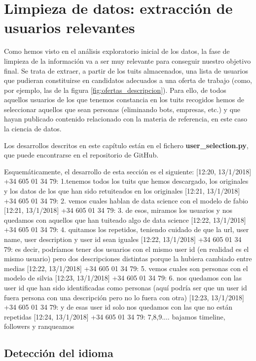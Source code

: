 
\chapter{Limpieza de datos: extracción de usuarios relevantes}
\label{chap:extraccion_de_usuarios}

Como hemos visto en el análisis exploratorio inicial de los datos, la fase 
de limpieza de la información va a ser muy relevante para conseguir
nuestro objetivo final. Se trata de extraer, a partir de los tuits almacenados, 
una lista de usuarios que pudieran constituirse en candidatos adecuados a 
una oferta de trabajo (como, por ejemplo, las de la figura \ref{fig:ofertas_descripcion}). 
Para ello, de todos aquellos usuarios de los que tenemos constancia en 
los tuits recogidos hemos de seleccionar aquellos que sean personas (eliminando bots, 
empresas, etc.) y que hayan publicado contenido relacionado con la materia de referencia, 
en este caso la ciencia de datos.


Los desarrollos descritos en este capítulo están en el fichero {\bf user_selection.py}, 
que puede encontrarse en el repositorio de GitHub.

Esquemáticamente, el desarrollo de esta sección es el siguiente:
[12:20, 13/1/2018] +34 605 01 34 79: 1.tenemos todos los tuits que hemos descargado, los originales y los datos de los que han sido retuiteados en los originales
[12:21, 13/1/2018] +34 605 01 34 79: 2. vemos cuales hablan de data science con el modelo de fabio
[12:21, 13/1/2018] +34 605 01 34 79: 3. de esos, miramos los usuarios y nos quedamos con aquellos que han tuiteado algo de data science
[12:22, 13/1/2018] +34 605 01 34 79: 4. quitamos los repetidos, teniendo cuidado de que la url, user name, user description y user id sean iguales
[12:22, 13/1/2018] +34 605 01 34 79: es decir, podríamos tener dos usuarios con el mismo user id (en realidad es el mismo usuario) pero dos descripciones distintas porque la hubiera cambiado entre medias
[12:22, 13/1/2018] +34 605 01 34 79: 5. vemos cuales son personas con el modelo de silvia
[12:23, 13/1/2018] +34 605 01 34 79: 6. nos quedamos con las user id que han sido identificadas como personas (aquí podría ser que un user id fuera persona con una descripción pero no lo fuera con otra)
[12:23, 13/1/2018] +34 605 01 34 79: y de esas user id solo nos quedamos con las que no están repetidas
[12:24, 13/1/2018] +34 605 01 34 79: 7,8,9.... bajamos timeline, followers y ranqueamos




\section{Detección del idioma} 


